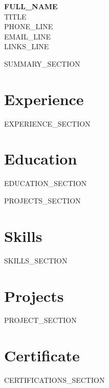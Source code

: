 \documentclass[11pt,a4paper]{article}
\begin{document}
\begin{center}
  {\huge\textbf{{FULL_NAME}}}\\[0.3cm]
  {{TITLE}}\\[0.4cm]
  \footnotesize
  {{PHONE_LINE}}\\
  {{EMAIL_LINE}}\\
  {{LINKS_LINE}}
\end{center}

\vspace{0.3cm}

{{SUMMARY_SECTION}}

\section{Experience}
{{EXPERIENCE_SECTION}}

\section{Education}
{{EDUCATION_SECTION}}

{{PROJECTS_SECTION}}

\section{Skills}
{{SKILLS_SECTION}}

\section{Projects}
{{PROJECT_SECTION}}

\section{Certificate}
{{CERTIFICATIONS_SECTION}}
\end{document}
